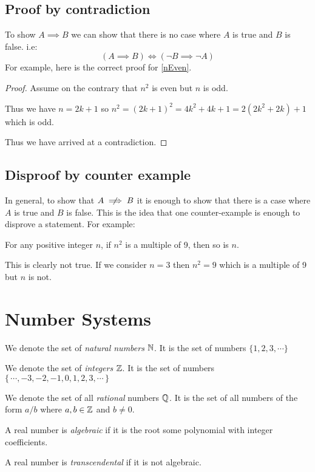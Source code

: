 \documentclass[../main.tex]{subfiles}
\begin{document}
\subsection{Proof by contradiction}
To show $A \implies B$ we can show that there is no case where $A$ is true and $B$ is false. i.e:
\[
  (A \implies B) \iff (\lnot B \implies \lnot A)
\]
For example, here is the correct proof for \cref{nEven}.
\begin{proof}
  Assume on the contrary that $n^2$ is even but $n$ is odd.

  Thus we have $n = 2k + 1$ so $n^2 = (2k + 1)^2 = 4k^2 + 4k + 1 = 2(2k^2 + 2k) + 1$ which is odd.

  Thus we have arrived at a contradiction.
\end{proof}
\subsection{Disproof by counter example}
In general, to show that $A \centernot\implies B$ it is enough to show that there is a case where $A$ is true and $B$ is false.
This is the idea that one counter-example is enough to disprove a statement.
For example:
\begin{proposition}
  For any positive integer $n$, if $n^2$ is a multiple of 9, then so is $n$.
\end{proposition}
This is clearly not true. If we consider $n = 3$ then $n^2 = 9$ which is a multiple of 9 but $n$ is not.
\section{Number Systems}
\begin{definition}
  We denote the set of \textit{natural numbers} $\mathbb{N}$. It is the set of numbers $\{1, 2, 3, \cdots\}$
\end{definition}
\begin{definition}[Integers]
  We denote the set of \textit{integers} $\mathbb{Z}$. It is the set of numbers $\{\,\cdots, -3, -2, -1 , 0, 1, 2, 3, \cdots\,\}$
\end{definition}
\begin{definition}
  We denote the set of all \textit{rational} numbers $\mathbb{Q}$. It is the set of all numbers of the form $a/b$ where $a, b \in \mathbb{Z}$ and $b \neq 0$.
\end{definition}
\begin{definition}
  A real number is \textit{algebraic} if it is the root some polynomial with integer coefficients.
\end{definition}
\begin{definition}
  A real number is \textit{transcendental} if it is not algebraic. 
\end{definition}
\end{document}
